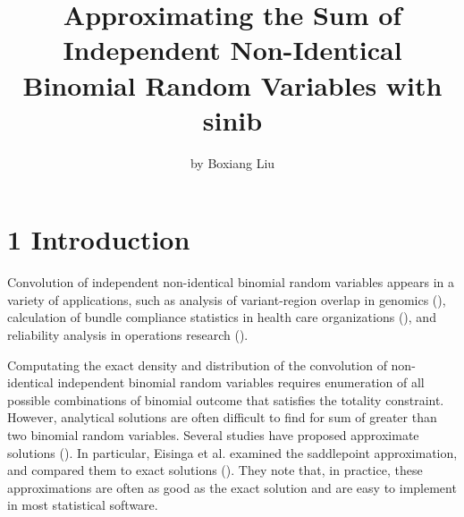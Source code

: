 \title{Approximating the Sum of Independent Non-Identical Binomial Random Variables with sinib}
\author{by Boxiang Liu}

\maketitle


\section{1 Introduction}

Convolution of independent non-identical binomial random variables appears in a variety of applications, such as analysis of variant-region overlap in genomics (\cite{Schmidt:2015ca}), calculation of bundle compliance statistics in health care organizations (\cite{Benneyan:2010ex}), and reliability analysis in operations research (\cite{Anonymous:iz}). 

Computating the exact density and distribution of the convolution of non-identical independent binomial random variables requires enumeration of all possible combinations of binomial outcome that satisfies the totality constraint. However, analytical solutions are often difficult to find for sum of greater than two binomial random variables. Several studies have proposed approximate solutions  (\cite{Johnson:2005hg,Jolayemi:1992jz}). In particular, Eisinga et al. examined  the saddlepoint approximation, and compared them to exact solutions (\cite{Eisinga:2013da}). They note that, in practice, these approximations are often as good as the exact solution and are easy to implement in most statistical software. 

